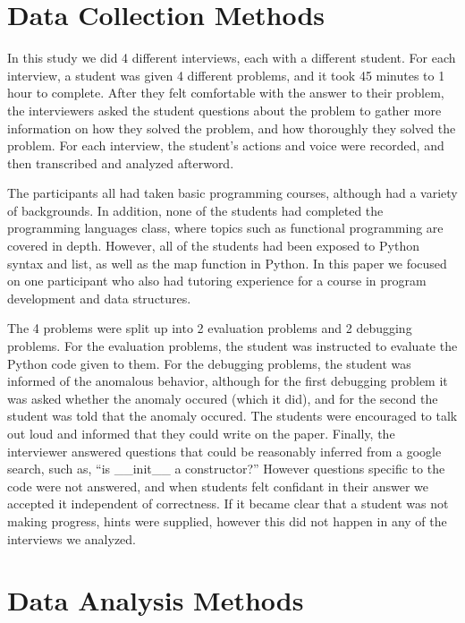 \documentclass{article}
\begin{document}
\newpage
\section{Data Collection Methods}

In this study we did 4 different interviews, each with a different student.
For each interview, a student was given 4 different problems, and it took 45 minutes to 1 hour to complete.
After they felt comfortable with the answer to their problem,
 the interviewers asked the student questions about the problem to gather more information on how they solved the problem,
 and how thoroughly they solved the problem.
For each interview, the student's actions and voice were recorded, and then transcribed and analyzed afterword.

The participants all had taken basic programming courses, although had a variety of backgrounds.
In addition, none of the students had completed the programming languages class, where topics such as functional programming are covered in depth.
However, all of the students had been exposed to Python syntax and list, as well as the map function in Python.
In this paper we focused on one participant who also had tutoring experience for a course in program development and data structures.

The 4 problems were split up into 2 evaluation problems and 2 debugging problems.
For the evaluation problems, the student was instructed to evaluate the Python code given to them.
For the debugging problems, the student was informed of the anomalous behavior,
 although for the first debugging problem it was asked whether the anomaly occured (which it did),
 and for the second the student was told that the anomaly occured.
The students were encouraged to talk out loud and informed that they could write on the paper.
Finally, the interviewer answered questions that could be reasonably inferred from a google search, such as,
``is __init__ a constructor?''
However questions specific to the code were not answered, and when students felt confidant in their answer we accepted it independent of correctness.
If it became clear that a student was not making progress, hints were supplied, however this did not happen in any of the interviews we analyzed.


\newpage
\section{Data Analysis Methods}

% 
\end{document}
